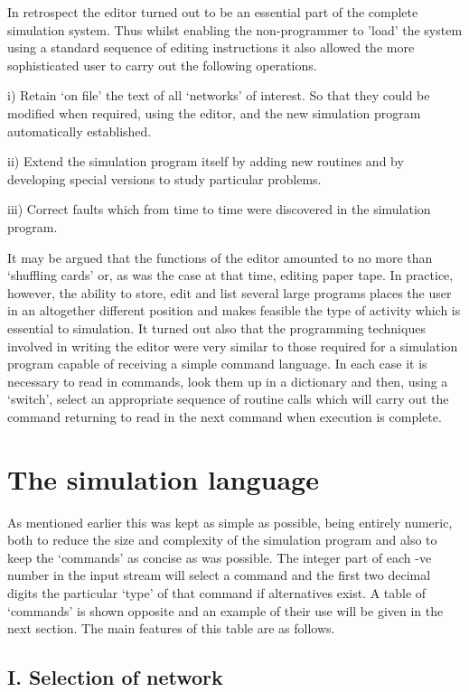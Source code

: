 In retrospect the editor turned out to be an essential part of the complete simulation system. Thus whilst enabling the non-programmer to 'load' the system using a standard sequence of editing instructions it also allowed the more sophisticated user to carry out the following operations.

i) Retain `on file' the text of all `networks' of interest. So that they could be modified when required, using the editor, and the new simulation program automatically established.

ii) Extend the simulation program itself by adding new routines and by developing special versions to study particular problems.

iii) Correct faults which from time to time were discovered in the simulation program.

It may be argued that the functions of the editor amounted to no more than `shuffling cards' or, as was the case at that time, editing paper tape. In practice, however, the ability to store, edit and list several large programs places the user in an altogether different position and makes feasible the type of activity which is essential to simulation. It turned out also that the programming techniques involved in writing the editor were very similar to those required for a simulation program capable of receiving a simple command language. In each case it is necessary to read in commands, look them up in a dictionary and then, using a `switch', select an appropriate sequence of routine calls which will carry out the command returning to read in the next command when execution is complete.

\section{The simulation language}

As mentioned earlier this was kept as simple as possible, being entirely numeric, both to reduce the size and complexity of the simulation program and also to keep the `commands' as concise as was possible. The integer part of each -ve number in the input stream will select a command and the first two decimal digits the particular `type' of that command if alternatives exist. A table of `commands' is shown opposite and an example of their use will be given in the next section. The main features of this table are as follows.

\subsection*{I. Selection of network}

